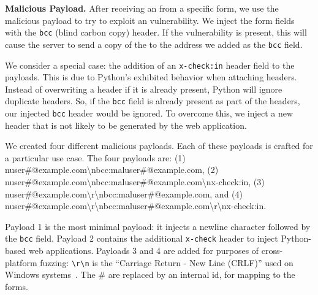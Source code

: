 \noindent\textbf{Malicious Payload.}
After receiving an \email from a specific form, we use the malicious payload to try to exploit an \ehi vulnerability. We inject the form fields with the \texttt{bcc} (blind carbon copy) header. If the vulnerability is present, this will cause the server to send a copy of the \email to the \email address we added as the \texttt{bcc} field.

We consider a special case: the addition of an \texttt{x-check:in} header field to the payloads. This is due to Python's exhibited behavior when attaching
headers. Instead of overwriting a header if it is already present, Python will ignore duplicate headers. So, if the \texttt{bcc} field is already present as part of the headers, our injected \texttt{bcc} header would be ignored. To overcome this, we inject a new header that is not likely to be generated by the web application. 

We created four different malicious payloads. Each of these payloads
is crafted for a particular use case. The four payloads are:
(1) nuser\#@example.com\textbackslash{}n\-bcc:\-maluser\-\#\-@example.com,
(2) nuser\#@\-example.com\textbackslash{}n\-bcc:\-maluser\-\#\-@example.com\textbackslash{}n\-x-check:in,
(3) nuser\#@\-example.com\textbackslash{}r\textbackslash{}n\-bcc:\-maluser\#\-@example.com,
and (4) nuser\#\-@example.com\-\textbackslash{}r\textbackslash{}n\-bcc:\-maluser\#\-@example.\-com\textbackslash{}r\textbackslash{}n\-x-check:in.
	
Payload 1 is the most minimal payload: it injects a newline character followed by the \texttt{bcc} field. Payload 2 contains the additional \texttt{x-check} header to inject Python-based web applications. Payloads 3 and 4 are added for purposes of cross-platform fuzzing: \texttt{\textbackslash{}r\textbackslash{}n} is the ``Carriage Return - New Line (CRLF)'' used on Windows systems~\cite{rfc2616}. The \# are replaced by an internal id, for mapping to the forms.



